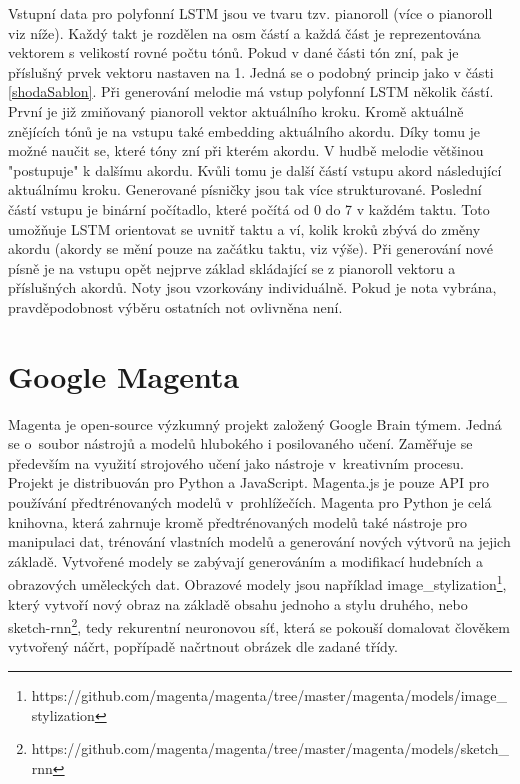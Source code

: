 Vstupní data pro polyfonní LSTM jsou ve tvaru tzv. pianoroll (více o pianoroll viz níže).
Každý takt je rozdělen na osm částí 
a každá část je reprezentována vektorem s velikostí rovné počtu tónů.
Pokud v dané části tón zní, pak je příslušný prvek vektoru nastaven na 1.
Jedná se o podobný princip jako v části \ref{shodaSablon}.
Při generování melodie má vstup polyfonní LSTM několik částí.
První je již zmiňovaný pianoroll vektor aktuálního kroku.
Kromě aktuálně znějících tónů je na vstupu také embedding 
aktuálního akordu.
Díky tomu je možné naučit se, které tóny zní při kterém akordu.
V hudbě melodie většinou "postupuje" k dalšímu akordu.
Kvůli tomu je další částí vstupu akord následující aktuálnímu kroku.
Generované písničky jsou tak více strukturované.
Poslední částí vstupu je binární počítadlo,
které počítá od 0 do 7 v každém taktu.
Toto umožňuje LSTM orientovat se uvnitř taktu
a ví, kolik kroků zbývá do změny akordu 
(akordy se mění pouze na začátku taktu, viz výše).
Při generování nové písně je na vstupu opět nejprve
základ skládající se z pianoroll vektoru a příslušných akordů.
Noty jsou vzorkovány individuálně.
Pokud je nota vybrána,
pravděpodobnost výběru ostatních not ovlivněna není.
\cite{Brunner_Jambot}

\section{Google Magenta}
\label{magenta}
Magenta je open-source výzkumný projekt založený Google Brain týmem.
Jedná se o~soubor nástrojů a modelů hlubokého i posilovaného učení.
Zaměřuje se především na využití strojového učení jako nástroje
v~kreativním procesu.
Projekt je distribuován pro Python a JavaScript.
Magenta.js je pouze API pro používání předtrénovaných modelů v~prohlížečích.
Magenta pro Python je celá knihovna, která zahrnuje kromě předtrénovaných modelů
také nástroje pro manipulaci dat, trénování vlastních modelů a generování
nových výtvorů na jejich základě.
\cite{google_magentaHome} 
Vytvořené modely se zabývají generováním a modifikací hudebních 
a obrazových uměleckých dat.
Obrazové modely jsou například image\_stylization\footnote{https://github.com/magenta/magenta/tree/master/magenta/models/image\_stylization},
který vytvoří nový obraz na základě obsahu jednoho a stylu druhého\cite{dumoulin2017learned},
nebo sketch-rnn\footnote{https://github.com/magenta/magenta/tree/master/magenta/models/sketch\_rnn},
tedy rekurentní neuronovou síť, která se pokouší domalovat člověkem vytvořený náčrt,
popřípadě načrtnout obrázek dle zadané třídy\cite{ha2017neural}.
\par

